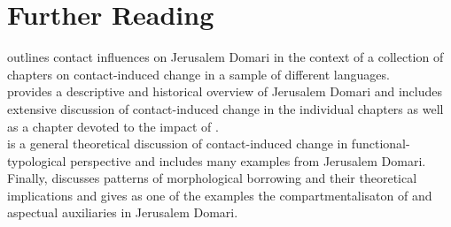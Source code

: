 \documentclass[output=paper]{langsci/langscibook}
\begin{document}
\section*{Further Reading}

\citet{Matras2007Domari} outlines contact influences on Jerusalem Domari in the context of a collection of chapters on contact-induced change in a sample of different languages.\\ \citet{Matras2012} provides a descriptive and historical overview of Jerusalem Domari and includes extensive discussion of contact-induced change in the individual chapters as well as a chapter devoted to the impact of .\\ \citet{Matras2009} is a general theoretical discussion of contact-induced change in functional-typological perspective and includes many examples from Jerusalem Domari.\\ Finally, \citet{Matras2015} discusses patterns of morphological borrowing and their theoretical implications and gives as one of the examples the compartmentalisaton of  and aspectual auxiliaries in Jerusalem Domari. 
\end{document}
